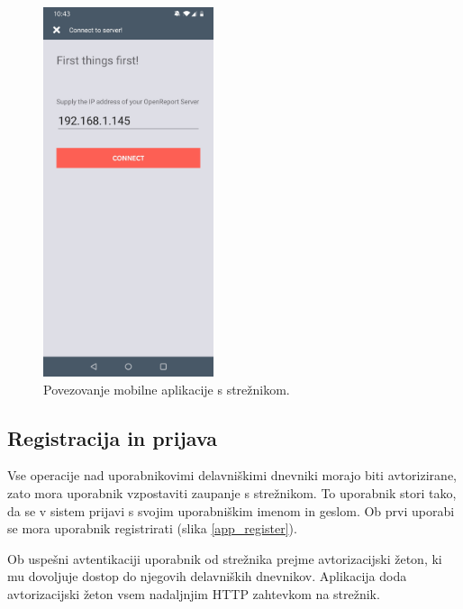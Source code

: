 \documentclass[a4paper, 12pt]{book}
\begin{document}
\begin{figure}[H]
\begin{center}
\includegraphics[width=5cm]{app_connect}
\end{center}
	\caption{Povezovanje mobilne aplikacije s strežnikom.}
\label{app_connect}
\end{figure}


\subsection{Registracija in prijava}

Vse operacije nad uporabnikovimi delavniškimi dnevniki morajo biti avtorizirane, zato mora uporabnik vzpostaviti zaupanje s strežnikom.
To uporabnik stori tako, da se v sistem prijavi s svojim uporabniškim imenom in geslom.
Ob prvi uporabi se mora uporabnik registrirati (slika \ref{app_register}).

Ob uspešni avtentikaciji uporabnik od strežnika prejme avtorizacijski žeton, ki mu dovoljuje dostop do njegovih delavniških dnevnikov.
Aplikacija doda avtorizacijski žeton vsem nadaljnjim HTTP zahtevkom na strežnik.
\end{document}
